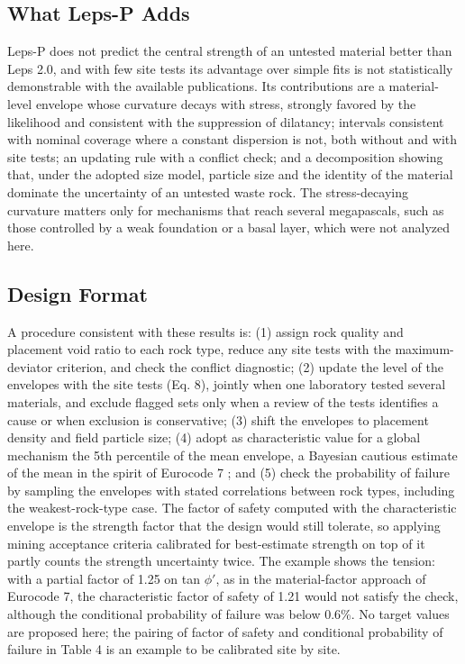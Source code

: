 \documentclass[Journal,letterpaper]{ascelike-new}
\begin{document}
\subsection{What Leps-P Adds}
Leps-P does not predict the central strength of an untested material better than Leps 2.0, and with few site tests its advantage over simple fits is not statistically demonstrable with the available publications. Its contributions are a material-level envelope whose curvature decays with stress, strongly favored by the likelihood and consistent with the suppression of dilatancy; intervals consistent with nominal coverage where a constant dispersion is not, both without and with site tests; an updating rule with a conflict check; and a decomposition showing that, under the adopted size model, particle size and the identity of the material dominate the uncertainty of an untested waste rock. The stress-decaying curvature matters only for mechanisms that reach several megapascals, such as those controlled by a weak foundation or a basal layer, which were not analyzed here.

\subsection{Design Format}
A procedure consistent with these results is: (1) assign rock quality and placement void ratio to each rock type, reduce any site tests with the maximum-deviator criterion, and check the conflict diagnostic; (2) update the level of the envelopes with the site tests (Eq. 8), jointly when one laboratory tested several materials, and exclude flagged sets only when a review of the tests identifies a cause or when exclusion is conservative; (3) shift the envelopes to placement density and field particle size; (4) adopt as characteristic value for a global mechanism the 5th percentile of the mean envelope, a Bayesian cautious estimate of the mean \cite{prastings2019} in the spirit of Eurocode 7 \cite{cen2004,cen2024}; and (5) check the probability of failure by sampling the envelopes with stated correlations between rock types, including the weakest-rock-type case. The factor of safety computed with the characteristic envelope is the strength factor that the design would still tolerate, so applying mining acceptance criteria calibrated for best-estimate strength \cite{read2009,hawley2017} on top of it partly counts the strength uncertainty twice. The example shows the tension: with a partial factor of 1.25 on tan $\phi'$, as in the material-factor approach of Eurocode 7, the characteristic factor of safety of 1.21 would not satisfy the check, although the conditional probability of failure was below 0.6\%. No target values are proposed here; the pairing of factor of safety and conditional probability of failure in Table 4 is an example to be calibrated site by site.
\end{document}
